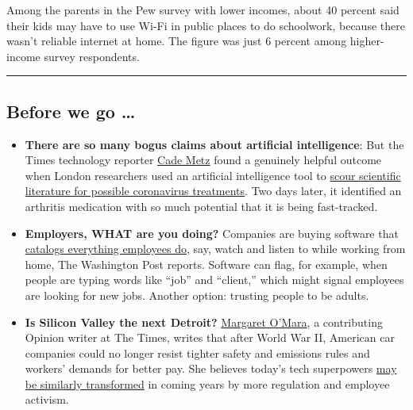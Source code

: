 Among the parents in the Pew survey with lower incomes, about 40 percent
said their kids may have to use Wi-Fi in public places to do schoolwork,
because there wasn't reliable internet at home. The figure was just 6
percent among higher-income survey respondents.

\begin{center}\rule{0.5\linewidth}{\linethickness}\end{center}

\hypertarget{before-we-go-}{%
\subsection{Before we go \ldots{}}\label{before-we-go-}}

\begin{itemize}
\item
  \textbf{There are so many bogus claims about artificial intelligence}:
  But the Times technology reporter
  \href{https://www.nytimes3xbfgragh.onion/by/cade-metz}{Cade Metz}
  found a genuinely helpful outcome when London researchers used an
  artificial intelligence tool to
  \href{https://www.nytimes3xbfgragh.onion/2020/04/30/technology/coronavirus-treatment-benevolentai-baricitinib.html}{scour
  scientific literature for possible coronavirus treatments}. Two days
  later, it identified an arthritis medication with so much potential
  that it is being fast-tracked.
\item
  \textbf{Employers, WHAT are you doing?} Companies are buying software
  that
  \href{https://www.washingtonpost.com/technology/2020/04/30/work-from-home-surveillance}{catalogs
  everything employees do}, say, watch and listen to while working from
  home, The Washington Post reports. Software can flag, for example,
  when people are typing words like ``job'' and ``client,'' which might
  signal employees are looking for new jobs. Another option: trusting
  people to be adults.
\item
  \textbf{Is Silicon Valley the next Detroit?}
  \href{https://www.nytimes3xbfgragh.onion/column/margaret-omara}{Margaret
  O'Mara}, a contributing Opinion writer at The Times, writes that after
  World War II, American car companies could no longer resist tighter
  safety and emissions rules and workers' demands for better pay. She
  believes today's tech superpowers
  \href{https://www.nytimes3xbfgragh.onion/2020/04/30/opinion/coronavirus-amazon-earnings.html}{may
  be similarly transformed} in coming years by more regulation and
  employee activism.
\end{itemize}


